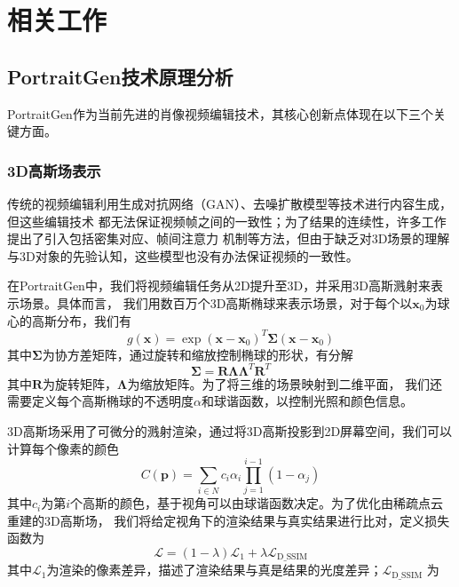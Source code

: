 
\chapter{相关工作}

\section{PortraitGen技术原理分析}

PortraitGen作为当前先进的肖像视频编辑技术，其核心创新点体现在以下三个关键方面。

\subsection{3D高斯场表示}

传统的视频编辑利用生成对抗网络（GAN）、去噪扩散模型等技术进行内容生成，但这些编辑技术
都无法保证视频帧之间的一致性；为了结果的连续性，许多工作提出了引入包括密集对应、帧间注意力
机制等方法，但由于缺乏对3D场景的理解与3D对象的先验认知，这些模型也没有办法保证视频的一致性。

在PortraitGen中，我们将视频编辑任务从2D提升至3D，并采用3D高斯溅射来表示场景。具体而言，
我们用数百万个3D高斯椭球来表示场景，对于每个以$\symbf{x}_0$为球心的高斯分布，我们有
\begin{equation}
    g(\symbf{x})=\exp{(\symbf{x}-\symbf{x}_0)^T\symbf{\Sigma}(\symbf{x}-\symbf{x}_0)}
\end{equation}
其中$\symbf{\Sigma}$为协方差矩阵，通过旋转和缩放控制椭球的形状，有分解
\begin{equation}
    \symbf{\Sigma}=\symbf{R}\symbf{\Lambda}\symbf{\Lambda}^T\symbf{R}^T
\end{equation}
其中$\symbf{R}$为旋转矩阵，$\symbf{\Lambda}$为缩放矩阵。为了将三维的场景映射到二维平面，
我们还需要定义每个高斯椭球的不透明度$\alpha$和球谐函数，以控制光照和颜色信息。

3D高斯场采用了可微分的溅射渲染，通过将3D高斯投影到2D屏幕空间，我们可以计算每个像素的颜色
\begin{equation}
    C(\symbf{p})=\sum_{i\in N}c_i\alpha_i\prod_{j=1}^{i-1}(1-\alpha_j)
\end{equation}
其中$c_i$为第$i$个高斯的颜色，基于视角可以由球谐函数决定。为了优化由稀疏点云重建的3D高斯场，
我们将给定视角下的渲染结果与真实结果进行比对，定义损失函数为
\begin{equation}
    \mathcal{L}=(1-\lambda)\mathcal{L}_1+\lambda\mathcal{L}_\text{D\_SSIM}
\end{equation}
其中$\mathcal{L}_1$为渲染的像素差异，描述了渲染结果与真是结果的光度差异；$\mathcal{L}_\text{D\_SSIM}$
为
